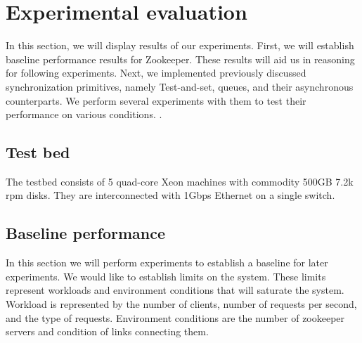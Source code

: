 \section{Experimental evaluation}\label{sec:eval}
In this section, we will display results of our experiments. First, we will establish baseline performance results for Zookeeper. These results will aid us in reasoning for following experiments. Next, we implemented previously discussed synchronization primitives, namely Test-and-set, queues, and their asynchronous counterparts. We perform several experiments with them to test their performance on various conditions. .




\subsection{Test bed}
The testbed consists of 5 quad-core Xeon  machines with commodity 500GB 7.2k rpm disks. They are interconnected with 1Gbps Ethernet on a single switch. 


\subsection{Baseline performance}
 In this section we will perform experiments to establish a baseline for later experiments. We would like to establish limits on the system. These limits represent workloads and environment conditions that will saturate the system. Workload is represented by the number of clients, number of requests per second, and the type of requests. Environment conditions are the number of zookeeper servers and condition of links connecting them.

